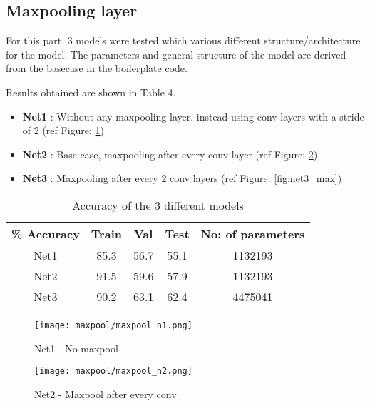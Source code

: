 \documentclass{article}
\begin{document}
\subsection{Maxpooling layer}
For this part, 3 models were tested which various different structure/architecture for the model. The parameters and general structure of the model are derived from the basecase in the boilerplate code.

\noindent
Results obtained are shown in Table 4.

\begin{itemize}
    \item \textbf{Net1} : Without any maxpooling layer, instead using conv layers with a stride of 2 (ref Figure: \ref{fig:net1_max})
    \item \textbf{Net2} : Base case, maxpooling after every conv layer (ref Figure: \ref{fig:net2_max})
    \item \textbf{Net3} : Maxpooling after every 2 conv layers (ref Figure: \ref{fig:net3_max})
\end{itemize}

\begin{table}[h!]
\begin{center}
 \begin{tabular}{||c | c c c| c||} 
 
 \hline
\% Accuracy  &  Train &  Val & Test & No: of parameters\\ [0.5ex] 
 \hline\hline
 Net1 & 85.3 & 56.7 & 55.1 & 1132193\\
 \hline
 Net2 & 91.5 & 59.6 & 57.9 & 1132193 \\
 \hline
 Net3 & 90.2 & 63.1 & 62.4 & 4475041\\
 \hline
 
\end{tabular}
\end{center}
\label{table:maxpool_table}
\vspace{-1.0em}
\caption{Accuracy of the 3 different models} 
\end{table}

\begin{figure}[H]
    \centering
    \texttt{[image: maxpool/maxpool\_n1.png]}
    \vspace{-1.0em}
    \caption{Net1 - No maxpool}
    \label{fig:net1_max}
\end{figure}

\begin{figure} [H]
    \centering
    \texttt{[image: maxpool/maxpool\_n2.png]}
    \vspace{-1.0em}
    \caption{Net2 - Maxpool after every conv}
    \label{fig:net2_max}
\end{figure}
\end{document}

